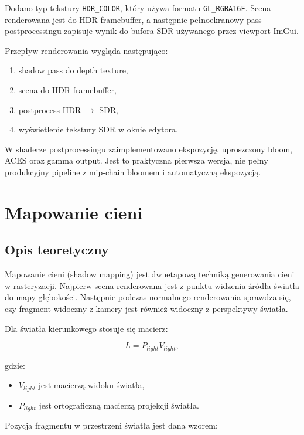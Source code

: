\documentclass[12pt,a4paper]{article}
\begin{document}
Dodano typ tekstury \texttt{HDR\_COLOR}, który używa formatu \texttt{GL\_RGBA16F}. Scena renderowana jest do HDR framebuffer, a następnie pełnoekranowy pass postprocessingu zapisuje wynik do bufora SDR używanego przez viewport ImGui.

Przepływ renderowania wygląda następująco:

\begin{enumerate}
    \item shadow pass do depth texture,
    \item scena do HDR framebuffer,
    \item postprocess HDR $\rightarrow$ SDR,
    \item wyświetlenie tekstury SDR w oknie edytora.
\end{enumerate}

W shaderze postprocessingu zaimplementowano ekspozycję, uproszczony bloom, ACES oraz gamma output. Jest to praktyczna pierwsza wersja, nie pełny produkcyjny pipeline z mip-chain bloomem i automatyczną ekspozycją.

\section{Mapowanie cieni}

\subsection{Opis teoretyczny}

Mapowanie cieni (shadow mapping) jest dwuetapową techniką generowania cieni w rasteryzacji. Najpierw scena renderowana jest z punktu widzenia źródła światła do mapy głębokości. Następnie podczas normalnego renderowania sprawdza się, czy fragment widoczny z kamery jest również widoczny z perspektywy światła.

Dla światła kierunkowego stosuje się macierz:

\begin{equation}
    L = P_{light} V_{light},
\end{equation}

gdzie:

\begin{itemize}
    \item $V_{light}$ jest macierzą widoku światła,
    \item $P_{light}$ jest ortograficzną macierzą projekcji światła.
\end{itemize}

Pozycja fragmentu w przestrzeni światła jest dana wzorem:
\end{document}
